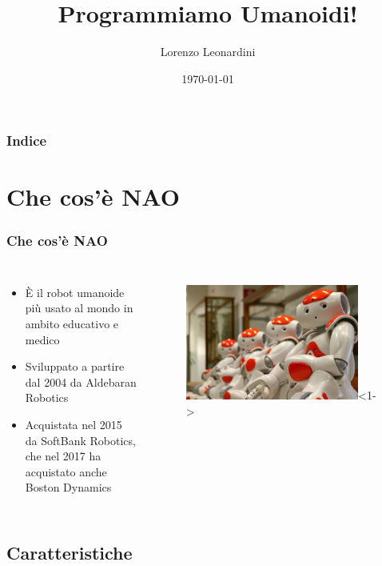 \documentclass[aspectratio=169]{beamer}
\title{Programmiamo Umanoidi!}
\subtitle{}
\author{Lorenzo Leonardini}
\institute{Scuola di Robotica}
\date{\today}
\begin{document}
\fi

\begin{frame}
	\titlepage
\end{frame}

\begin{frame}
\frametitle{Indice}
\tableofcontents
\end{frame}

\section{Che cos'è NAO}

\begin{frame}
\frametitle{Che cos'è NAO}
\begin{columns}
		\begin{itemize}
			\item<1-> È il robot umanoide più usato al mondo in ambito educativo e medico
			\item<2-> Sviluppato a partire dal 2004 da Aldebaran Robotics
			\item<3-> Acquistata nel 2015 da SoftBank Robotics, che nel 2017 ha acquistato anche Boston Dynamics
		\end{itemize}
		\begin{figure}[ht]
		\begin{center}
		\includegraphics[width=0.9\textwidth]{nao1.jpg}<1->
		\end{center}
		\end{figure}
\end{columns}
\end{frame}

\subsection{Caratteristiche}
\end{document}
